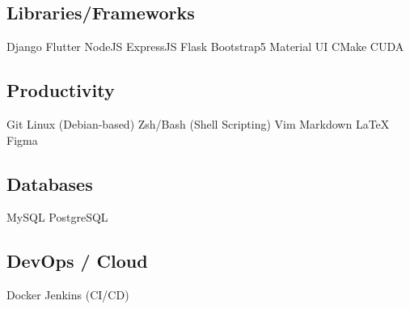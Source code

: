 \documentclass[]{openfont}
\begin{document}
\begin{minipage}[t]{0.33\textwidth}
    \subsection{Libraries/Frameworks}
    Django \textbullet{} Flutter \textbullet{} NodeJS \textbullet{} ExpressJS \textbullet{} Flask \textbullet{} Bootstrap5 \textbullet{} Material UI \textbullet{} CMake \textbullet{} CUDA
    \sectionsep

    \subsection{Productivity}
    Git \textbullet{} Linux (Debian-based) \textbullet{} Zsh/Bash (Shell Scripting) \textbullet{} Vim \textbullet{} Markdown \textbullet{} LaTeX \textbullet{} Figma
    \sectionsep

    \subsection{Databases}
    MySQL \textbullet{} PostgreSQL
    \sectionsep

    \subsection{DevOps / Cloud}
    Docker \textbullet{} Jenkins (CI/CD)
    \sectionsep


\end{minipage}
\hfill
\end{document}
